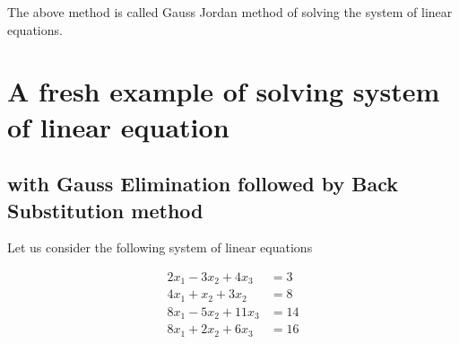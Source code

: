 \documentclass{article}
\begin{document}
The above method is called Gauss Jordan method of solving the system of linear equations.

\section{A fresh example of solving system of linear equation}

\subsection{with Gauss Elimination followed by Back Substitution method}
Let us consider the following system of linear equations

\[
\begin{split}
    2x_1 - 3x_2 + 4x_3 &= 3\\
    4x_1 + x_2 + 3x_2 &= 8\\
    8x_1 - 5x_2 + 11x_3 &= 14\\
    8x_1 + 2x_2 + 6x_3 &= 16
\end{split}
\]
\end{document}
